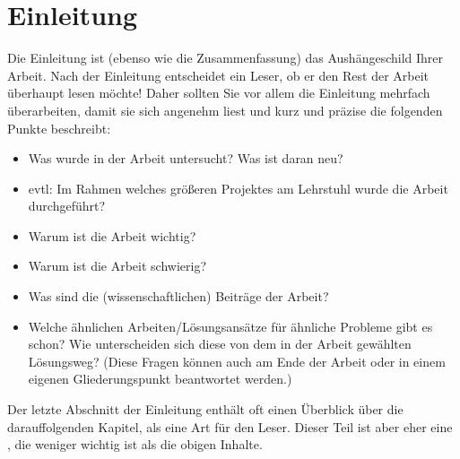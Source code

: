 
\chapter{Einleitung}
Die Einleitung ist (ebenso wie die Zusammenfassung) das Aushängeschild Ihrer Arbeit. Nach der Einleitung entscheidet ein Leser, ob er den Rest der Arbeit überhaupt lesen möchte! Daher sollten Sie vor allem die Einleitung mehrfach überarbeiten, damit sie sich angenehm liest und kurz und präzise die folgenden Punkte beschreibt:
\begin{itemize}
  \item Was wurde in der Arbeit untersucht? Was ist daran neu?
  \item evtl: Im Rahmen welches größeren Projektes am Lehrstuhl wurde die Arbeit durchgeführt?
  \item Warum ist die Arbeit wichtig?
  \item Warum ist die Arbeit schwierig?
  \item Was sind die (wissenschaftlichen) Beiträge der Arbeit?
  \item Welche ähnlichen Arbeiten/Lösungsansätze für ähnliche Probleme gibt es schon? Wie unterscheiden sich diese von dem in der Arbeit gewählten Lösungsweg? (Diese Fragen können auch am Ende der Arbeit oder in einem eigenen Gliederungspunkt beantwortet werden.)
\end{itemize}

Der letzte Abschnitt der Einleitung enthält oft einen Überblick über die darauffolgenden Kapitel, als eine Art  für den Leser. Dieser Teil ist aber eher eine , die weniger wichtig ist als die obigen Inhalte.

